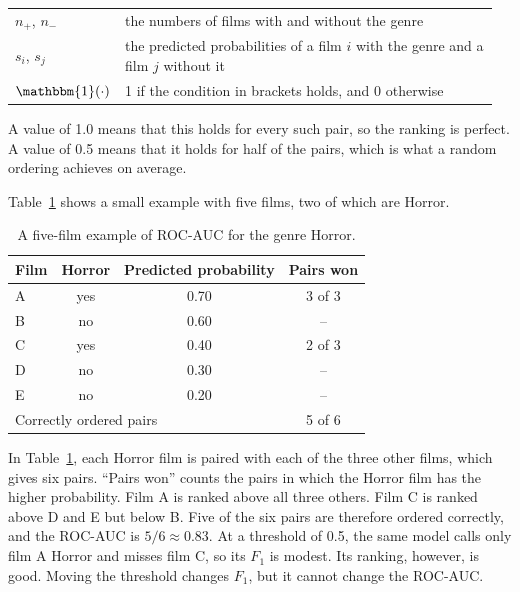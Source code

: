 \smallskip
\noindent\begin{tabular}{@{}p{0.17\linewidth}p{0.79\linewidth}@{}}
  $n_{+}$, $n_{-}$ & the numbers of films with and without the genre \\
  $s_i$, $s_j$ & the predicted probabilities of a film $i$ with the genre and a film $j$ without it \\
  $\mathbbm{1}(\cdot)$ & 1 if the condition in brackets holds, and 0 otherwise \\
\end{tabular}
\smallskip

\noindent  A value of 1.0 means that this holds for every such pair, so the ranking is perfect. A value of 0.5 means that it holds for half of the pairs, which is what a random ordering achieves on average.

Table~\ref{tab:auc_example} shows a small example with five films, two of which are Horror.

\begin{table}[H]
  \centering
  \small
  \caption{A five-film example of ROC-AUC for the genre Horror.}
  \label{tab:auc_example}
  \begin{tabular}{lccc}
    \toprule
    Film & Horror & Predicted probability & Pairs won \\
    \midrule
    A & yes & 0.70 & 3 of 3 \\
    B & no  & 0.60 & -- \\
    C & yes & 0.40 & 2 of 3 \\
    D & no  & 0.30 & -- \\
    E & no  & 0.20 & -- \\
    \midrule
    \multicolumn{3}{l}{Correctly ordered pairs} & 5 of 6 \\
    \bottomrule
  \end{tabular}
\end{table}

In Table~\ref{tab:auc_example}, each Horror film is paired with each of the three other films, which gives six pairs. ``Pairs won'' counts the pairs in which the Horror film has the higher probability. Film A is ranked above all three others. Film C is ranked above D and E but below B. Five of the six pairs are therefore ordered correctly, and the ROC-AUC is $5/6 \approx 0.83$. At a threshold of 0.5, the same model calls only film A Horror and misses film C, so its $F_1$ is modest. Its ranking, however, is good. Moving the threshold changes $F_1$, but it cannot change the ROC-AUC.

